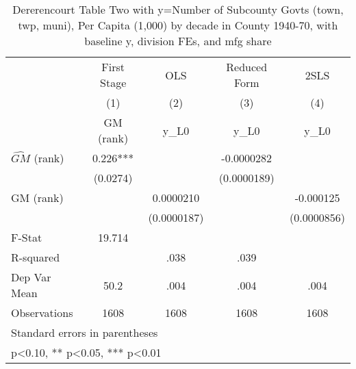 \begin{table}[htbp]\centering
\def\sym#1{\ifmmode^{#1}\else\(^{#1}\)\fi}
\caption{Dererencourt Table Two with y=Number of Subcounty Govts (town, twp, muni), Per Capita (1,000) by decade in County 1940-70, with baseline y, division FEs, and mfg share}
\begin{tabular}{l*{4}{c}}
\toprule
                    & First Stage   &         OLS   &Reduced Form   &        2SLS   \\
                    &\multicolumn{1}{c}{(1)}&\multicolumn{1}{c}{(2)}&\multicolumn{1}{c}{(3)}&\multicolumn{1}{c}{(4)}\\
                    &\multicolumn{1}{c}{GM  (rank)}&\multicolumn{1}{c}{y\_L0}&\multicolumn{1}{c}{y\_L0}&\multicolumn{1}{c}{y\_L0}\\
\midrule
$\hat{GM}$ (rank)   &       0.226***&               &  -0.0000282   &               \\
                    &    (0.0274)   &               & (0.0000189)   &               \\
\addlinespace
GM  (rank)          &               &   0.0000210   &               &   -0.000125   \\
                    &               & (0.0000187)   &               & (0.0000856)   \\
\midrule
F-Stat              &      19.714   &               &               &               \\
R-squared           &               &        .038   &        .039   &               \\
Dep Var Mean        &        50.2   &        .004   &        .004   &        .004   \\
Observations        &        1608   &        1608   &        1608   &        1608   \\
\bottomrule
\multicolumn{5}{l}{\footnotesize Standard errors in parentheses}\\
\multicolumn{5}{l}{\footnotesize * p<0.10, ** p<0.05, *** p<0.01}\\
\end{tabular}
\end{table}
